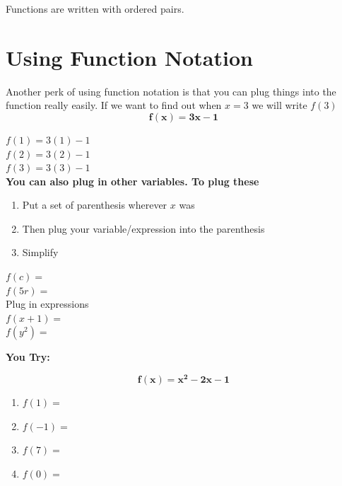 \documentclass[12pt]{article}
\let\stdsection\section
\renewcommand\section{\newpage\stdsection}
\begin{document}
Functions are written with ordered pairs. 

\section{Using Function Notation}

Another perk of using function notation is that you can plug things into the function really easily. If we want to find out when $x=3$ we will write $f(3)$\\

$$\mathbf{f(x)=3x-1}$$

$f(1)=3(1)-1$\\

$f(2)=3(2)-1$\\

$f(3)=3(3)-1$\\

\textbf{You can also plug in other variables. To plug these}\\

\begin{enumerate}
\item Put a set of parenthesis wherever $x$ was\\

\item Then plug your variable/expression into the parenthesis\\

\item Simplify\\
\end{enumerate}


$f(c)=$\\

$f(5r)=$\\

Plug in expressions\\

$f(x+1)=$\\

$f(y^2)=$\\

\hrulefill

\textbf{You Try:}

$$\mathbf{f(x)=x^2-2x-1}$$

\begin{enumerate}

	\item $f(1)=$
	
	\item $f(-1)=$
	
	\item $f(7)=$
	
	\item $f(0)=$
	
\end{enumerate}
\end{document}

